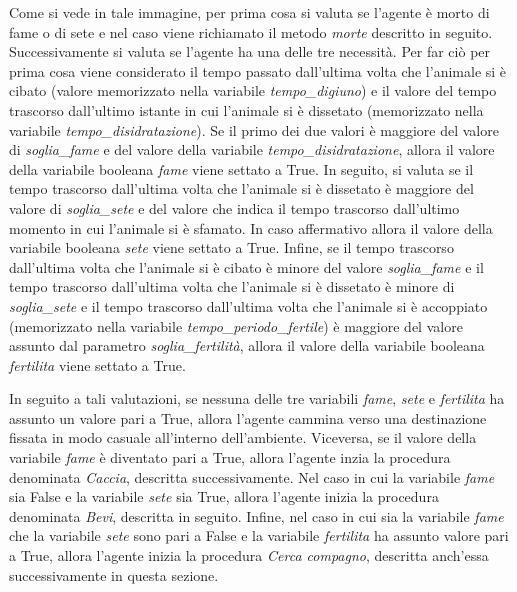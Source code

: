 \documentclass[11pt]{article}
\begin{document}
Come si vede in tale immagine, per prima cosa si valuta se l'agente è morto di fame o di sete e nel caso viene richiamato il metodo \emph{morte} descritto in seguito.  Successivamente si valuta se l'agente ha una delle tre necessità. Per far ciò per prima cosa viene considerato il tempo passato dall'ultima volta che l'animale si è cibato (valore memorizzato nella variabile \emph{tempo\_digiuno}) e il valore del tempo trascorso dall'ultimo istante in cui l'animale si è dissetato (memorizzato nella variabile \emph{tempo\_disidratazione}). Se il primo dei due valori è maggiore del valore di \emph{soglia\_fame} e del valore della variabile \emph{tempo\_disidratazione}, allora il valore della variabile booleana \emph{fame} viene settato a True. In seguito, si valuta se il tempo trascorso dall'ultima volta che l'animale si è dissetato è maggiore del valore di \emph{soglia\_sete} e del valore che indica il tempo trascorso dall'ultimo momento in cui l'animale si è sfamato. In caso affermativo allora il valore della variabile booleana \emph{sete} viene settato a True. Infine, se il tempo trascorso dall'ultima volta che l'animale si è cibato è minore del valore \emph{soglia\_fame} e il tempo trascorso dall'ultima volta che l'animale si è dissetato è minore di \emph{soglia\_sete} e il tempo trascorso dall'ultima volta che l'animale si è accoppiato (memorizzato nella variabile \emph{tempo\_periodo\_fertile}) è maggiore del valore assunto dal parametro \emph{soglia\_fertilità}, allora il valore della variabile booleana \emph{fertilita} viene settato a True. 

In seguito a tali valutazioni, se nessuna delle tre variabili \emph{fame}, \emph{sete} e \emph{fertilita} ha assunto un valore pari a True, allora l'agente cammina verso una destinazione fissata in modo casuale all'interno dell'ambiente. Viceversa, se il valore della variabile \emph{fame} è diventato pari a True, allora l'agente inzia la procedura denominata \emph{Caccia}, descritta successivamente. Nel caso in cui la variabile \emph{fame} sia False e la variabile \emph{sete} sia True, allora l'agente inizia la procedura denominata \emph{Bevi}, descritta in seguito. Infine, nel caso in cui sia la variabile \emph{fame} che la variabile \emph{sete} sono pari a False e la variabile \emph{fertilita} ha assunto valore pari a True, allora l'agente inizia la procedura \emph{Cerca compagno}, descritta anch'essa successivamente in questa sezione. 
\end{document}
